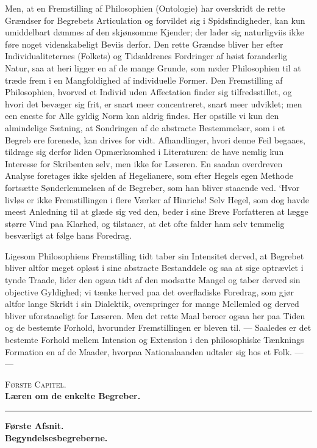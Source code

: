 \documentclass[12pt]{article}
\newcommand{\opage}[1]{\marginnote{\footnotesize\textit{[#1]}}}
\begin{document}
Men, at en Fremstilling af Philosophien (Ontologie) har overskridt de rette
Grændser for Begrebets Articulation og for\opage{205}vildet sig i
Spidsfindigheder, kan kun umiddelbart dømmes af den skjønsomme Kjender; der lader
sig naturligviis ikke føre noget videnskabeligt Beviis derfor. Den rette Grændse
bliver her efter Individualiteternes (Folkets) og Tidsaldrenes Fordringer af
høist foranderlig Natur, saa at heri ligger en af de mange Grunde, som nøder
Philosophien til at træde frem i en Mangfoldighed af individuelle Former. Den
Fremstilling af Philosophien, hvorved et Individ uden Affectation finder sig
tilfredsstillet, og hvori det bevæger sig frit, er snart meer concentreret, snart
meer udviklet; men een eneste for Alle gyldig Norm kan aldrig findes. Her
opstille vi kun den almindelige Sætning, at Sondringen af de abstracte
Bestemmelser, som i et Begreb ere forenede, kan drives for vidt. Afhandlinger,
hvori denne Feil begaaes, tildrage sig derfor liden Opmærksomhed i Literaturen:
de have nemlig kun Interesse for Skribenten selv, men ikke for Læseren. En
saadan overdreven Analyse foretages ikke sjelden af Hegelianere, som efter Hegels
egen Methode fortsætte Sønderlemmelsen af de Begreber, som han bliver staaende
ved. `Hvor livløs er ikke Fremstillingen i flere Værker af Hinrichs! Selv Hegel,
som dog havde meest Anledning til at glæde sig ved den, beder i sine Breve
Forfatteren at lægge større Vind paa Klarhed, og tilstaaer, at det ofte falder
ham selv temmelig besværligt at følge hans Foredrag.

Ligesom Philosophiens Fremstilling tidt taber sin Intensitet derved, at Begrebet
bliver altfor meget opløst i sine abstracte Bestanddele og saa at sige optrævlet
i tynde Traade, lider den ogsaa tidt af den modsatte Mangel og taber derved sin
objective Gyldighed; vi tænke herved paa det overfladiske Foredrag, som gjør
altfor lange Skridt i sin Dialektik, overspringer for mange Mellemled og derved
bliver uforstaaeligt for Læseren. Men det rette Maal beroer ogsaa her paa Tiden
og de bestemte Forhold, hvorunder Fremstillingen er bleven til. --- Saaledes er
det bestemte \opage{206}Forhold mellem Intension og Extension i den philosophiske
Tænknings Formation en af de Maader, hvorpaa Nationalaanden udtaler sig hos et
Folk. --- ---

\bigskip
\begin{center}
{\large\scshape Første Capitel.}\\[0.4em]
{\large\bfseries Læren om de enkelte Begreber.}
\end{center}
\begin{center}\rule{0.25\textwidth}{0.4pt}\end{center}
\begin{center}
{\bfseries Første Afsnit.}\\[0.3em]
{\bfseries Begyndelsesbegreberne.}
\end{center}
\medskip
\end{document}
